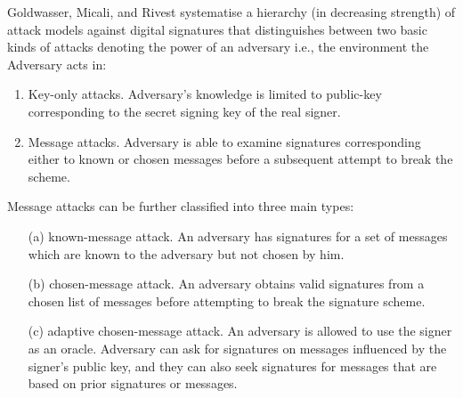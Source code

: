 \documentclass[]{final_report}
\theoremstyle{definition}
\begin{document}
Goldwasser, Micali, and Rivest systematise a hierarchy (in decreasing strength) of attack models against digital signatures that distinguishes between two basic kinds of attacks denoting the power of an adversary i.e., the environment the Adversary acts in:
\begin{enumerate}
    \item Key-only attacks. Adversary's knowledge is limited to public-key corresponding to the secret signing key of the real signer.
    \item Message attacks. Adversary is able to examine signatures corresponding either to known or chosen messages before a subsequent  attempt to break the scheme.
\end{enumerate}
Message attacks can be further classified into three main types:
\begin{itemize}
    \item [(a)] known-message attack. An adversary has signatures for a set of messages which are known to the adversary but not chosen by him.
    \item [(b)] chosen-message attack. An adversary obtains valid signatures from a chosen list of messages before attempting to break the signature scheme. 
    \item [(c)] adaptive chosen-message attack. An adversary is allowed to use the signer as an oracle. Adversary can ask for signatures on messages influenced by the signer's public key, and they can also seek signatures for messages that are based on prior signatures or messages.
\end{itemize}
\end{document}
